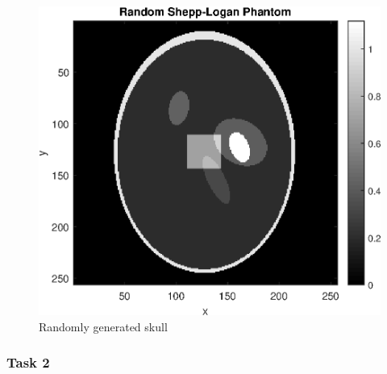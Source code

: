 \begin{figure}[htb!]
    \centering
    \includegraphics[width=\linewidth]{homework1/img/10.eps}
    \caption{Randomly generated skull}
    \label{fig:rand_skull}
\end{figure}

\clearpage
\newpage
\subsubsection*{Task 2}

